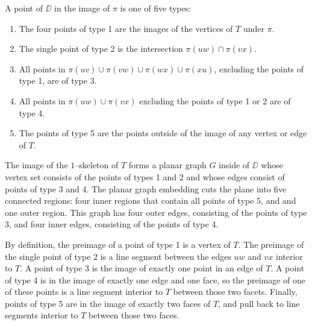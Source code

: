 \begin{defn}
	\label{def:projpttypes}
	A point of $\DD$ in the image of $\pi$ is one of five types:
	\begin{enumerate}
		\item The four points of type 1 are the images of the vertices of $T$ under $\pi$.
		\item The single point of type 2 is the intersection $\pi(uw)\cap\pi(vx)$.
		\item All points in $\pi(uv)\cup\pi(vw)\cup\pi(wx)\cup\pi(xu)$, excluding the points of type 1, are of type 3.
		\item All points in $\pi(uw)\cup\pi(vx)$ excluding the points of type 1 or 2 are of type 4.
		\item The points of type 5 are the points outside of the image of any vertex or edge of $T$.
	\end{enumerate}
	The image of the $1$--skeleton of $T$ forms a planar graph $G$ inside of $\DD$ whose vertex set consists of the points of types 1 and 2 and whose edges consist of points of type 3 and 4.
	The planar graph embedding cuts the plane into five connected regions: four inner regions that contain all points of type 5, and and one outer region.
	This graph has four outer edges, consisting of the points of type 3, and four inner edges, consisting of the points of type 4.
	
	By definition, the preimage of a point of type 1 is a vertex of $T$.
	The preimage of the single point of type 2 is a line segment between the edges $uw$ and $vx$ interior to $T$.
	A point of type 3 is the image of exactly one point in an edge of $T$.
	A point of type 4 is in the image of exactly one edge and one face, so the preimage of one of these points is a line segment interior to $T$ between those two facets.
	Finally, points of type 5 are in the image of exactly two faces of $T$, and pull back to line segments interior to $T$ between those two faces.
\end{defn}
